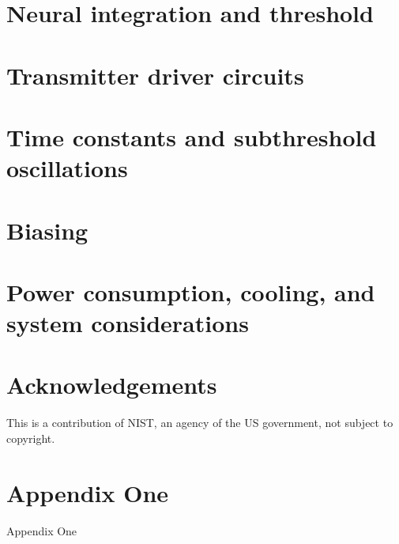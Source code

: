 \documentclass[twocolumn]{article}
\begin{document}
\section{\label{sec:neurons}Neural integration and threshold}

\section{\label{sec:transmitters}Transmitter driver circuits}

\section{\label{sec:time_constants}Time constants and subthreshold oscillations}

\section{\label{sec:biasing}Biasing}

\section{\label{sec:systems}Power consumption, cooling, and system considerations}




\section{Acknowledgements}

\vspace{1em}
\noindent This is a contribution of NIST, an agency of the US government, not subject to copyright.

\appendix

\section{\label{apx:one}Appendix One}
Appendix One

	

\end{document}
